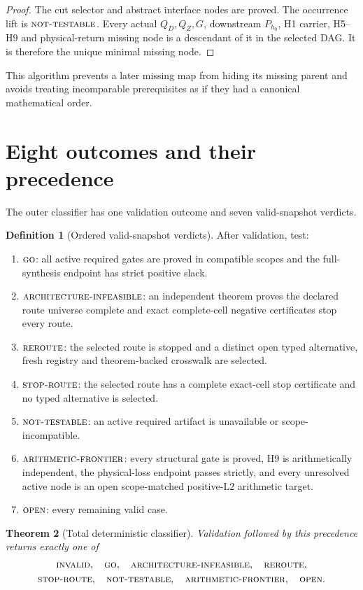 \documentclass[11pt]{article}
\newtheorem{theorem}{Theorem}[section]
\theoremstyle{definition}
\newtheorem{definition}[theorem]{Definition}
\theoremstyle{remark}
\newcommand{\Ltwo}{\mathrm{L2}}
\newcommand{\GO}{\textnormal{\textsc{go}}}
\newcommand{\AINF}{\textnormal{\textsc{architecture-infeasible}}}
\newcommand{\REROUTE}{\textnormal{\textsc{reroute}}}
\newcommand{\STOPR}{\textnormal{\textsc{stop-route}}}
\newcommand{\NT}{\textnormal{\textsc{not-testable}}}
\newcommand{\AF}{\textnormal{\textsc{arithmetic-frontier}}}
\newcommand{\OPEN}{\textnormal{\textsc{open}}}
\newcommand{\INVALID}{\textnormal{\textsc{invalid}}}
\begin{document}
\begin{proof}
The cut selector and abstract interface nodes are proved.  The
occurrence lift is \(\NT\).  Every actual \(Q_D,Q_Z,G\), downstream
\(P_{h_0}\), H1 carrier, H5--H9 and physical-return missing node is a
descendant of it in the selected DAG.  It is therefore the unique
minimal missing node.
\end{proof}

This algorithm prevents a later missing map from hiding its missing
parent and avoids treating incomparable prerequisites as if they had
a canonical mathematical order.

\section{Eight outcomes and their precedence}

The outer classifier has one validation outcome and seven
valid-snapshot verdicts.

\begin{definition}[Ordered valid-snapshot verdicts]
After validation, test:
\begin{enumerate}[label=(\roman*),leftmargin=2.2em]
\item \(\GO\): all active required gates are proved in compatible
  scopes and the full-synthesis endpoint has strict positive slack.
\item \(\AINF\): an independent theorem proves the declared route
  universe complete and exact complete-cell negative certificates
  stop every route.
\item \(\REROUTE\): the selected route is stopped and a distinct open
  typed alternative, fresh registry and theorem-backed crosswalk are
  selected.
\item \(\STOPR\): the selected route has a complete exact-cell stop
  certificate and no typed alternative is selected.
\item \(\NT\): an active required artifact is unavailable or
  scope-incompatible.
\item \(\AF\): every structural gate is proved, H9 is arithmetically
  independent, the physical-loss endpoint passes strictly, and every
  unresolved active node is an open scope-matched positive-\(\Ltwo\)
  arithmetic target.
\item \(\OPEN\): every remaining valid case.
\end{enumerate}
\end{definition}

\begin{theorem}[Total deterministic classifier]
Validation followed by this precedence returns exactly one of
\[
\begin{gathered}
 \INVALID,\quad \GO,\quad \AINF,\quad \REROUTE,\\
 \STOPR,\quad \NT,\quad \AF,\quad \OPEN.
\end{gathered}
\]
\end{theorem}
\end{document}
